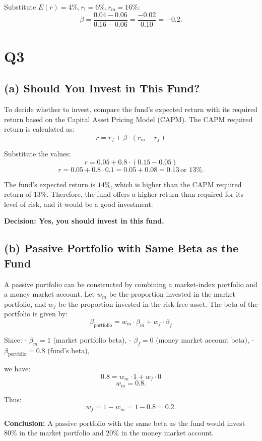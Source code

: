 \documentclass{article}
\begin{document}
Substitute \( E(r) = 4\%, r_{\text{f}} = 6\%, r_{\text{m}} = 16\% \):
\[
\beta = \frac{0.04 - 0.06}{0.16 - 0.06} = \frac{-0.02}{0.10} = -0.2.
\]


\newpage


\section*{\textbf{Q3}}

\subsection*{\textbf{(a) Should You Invest in This Fund?}}

To decide whether to invest, compare the fund's expected return with its required return based on the Capital Asset Pricing Model (CAPM). The CAPM required return is calculated as:
\[
r = r_f + \beta \cdot (r_m - r_f)
\]

Substitute the values:
\[
r = 0.05 + 0.8 \cdot (0.15 - 0.05)
\]
\[
r = 0.05 + 0.8 \cdot 0.1 = 0.05 + 0.08 = 0.13 \, \text{or } 13\%.
\]

The fund's expected return is \( 14\% \), which is higher than the CAPM required return of \( 13\% \). Therefore, the fund offers a higher return than required for its level of risk, and it would be a good investment.

\textbf{Decision: Yes, you should invest in this fund.}

\subsection*{\textbf{(b) Passive Portfolio with Same Beta as the Fund}}

A passive portfolio can be constructed by combining a market-index portfolio and a money market account. Let \( w_m \) be the proportion invested in the market portfolio, and \( w_f \) be the proportion invested in the risk-free asset. The beta of the portfolio is given by:
\[
\beta_{\text{portfolio}} = w_m \cdot \beta_m + w_f \cdot \beta_f
\]

Since:
- \( \beta_m = 1 \) (market portfolio beta),
- \( \beta_f = 0 \) (money market account beta),
- \( \beta_{\text{portfolio}} = 0.8 \) (fund's beta),

we have:
\[
0.8 = w_m \cdot 1 + w_f \cdot 0
\]
\[
w_m = 0.8.
\]

Thus:
\[
w_f = 1 - w_m = 1 - 0.8 = 0.2.
\]

\textbf{Conclusion:} A passive portfolio with the same beta as the fund would invest \( 80\% \) in the market portfolio and \( 20\% \) in the money market account.
\end{document}
